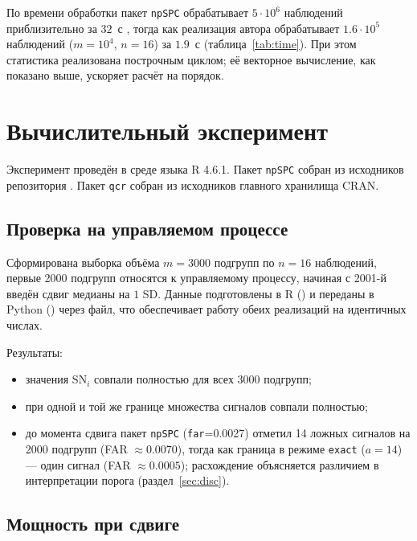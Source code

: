 \documentclass[11pt,a4paper]{article}
\newcommand{\SN}{\mathrm{SN}}
\begin{document}
По времени обработки пакет \texttt{npSPC}
обрабатывает $5\cdot10^6$ наблюдений приблизительно за $32$~с
\cite{Nascimento2026}, тогда как реализация автора обрабатывает
$1.6\cdot10^5$ наблюдений ($m=10^4$, $n=16$) за $1.9$~с
(таблица~\ref{tab:time}). При этом статистика реализована построчным циклом;
её векторное вычисление, как показано выше, ускоряет расчёт на порядок.

\section{Вычислительный эксперимент}

Эксперимент проведён в среде языка R 4.6.1. Пакет
\texttt{npSPC} собран из исходников репозитория
\cite{Nascimento2026}. Пакет \texttt{qcr} собран из исходников главного
хранилища CRAN.

\subsection{Проверка на управляемом процессе}

Сформирована выборка объёма $m=3000$ подгрупп по $n=16$ наблюдений, первые
2000 подгрупп относятся к управляемому процессу, начиная с 2001-й введён
сдвиг медианы на $1$ SD. Данные подготовлены в R
() и переданы в Python
() через файл, что обеспечивает работу
обеих реализаций на идентичных числах.

Результаты:
\begin{itemize}[itemsep=1pt]
  \item значения $\SN_i$ совпали полностью для всех $3000$ подгрупп;
  \item при одной и той же границе множества сигналов совпали полностью;
  \item до момента сдвига пакет \texttt{npSPC} (\texttt{far}=0.0027) отметил
        14 ложных сигналов на 2000 подгрупп (FAR $\approx 0.0070$), 
        тогда как граница в режиме \texttt{exact} ($a=14$) --- 
        один сигнал (FAR $\approx 0.0005$); расхождение
        объясняется различием в интерпретации порога
        (раздел~\ref{sec:disc}).
\end{itemize}

\subsection{Мощность при сдвиге}
\end{document}
